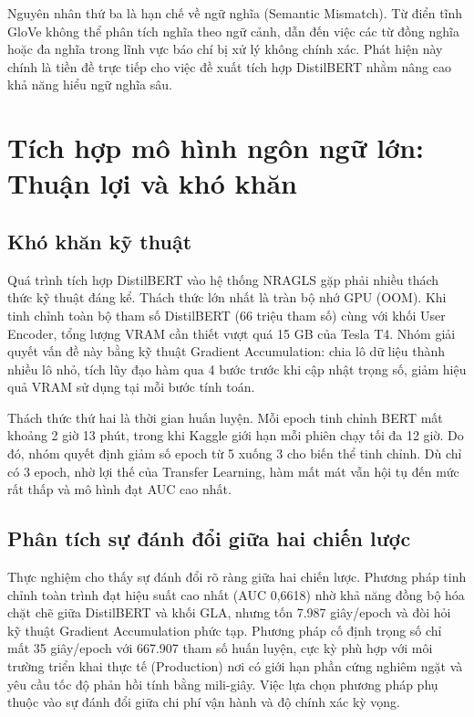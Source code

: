 \documentclass[../BTL.tex]{subfiles}
\begin{document}
Nguyên nhân thứ ba là hạn chế về ngữ nghĩa (Semantic Mismatch). Từ điển tĩnh GloVe không thể phân tích nghĩa theo ngữ cảnh, dẫn đến việc các từ đồng nghĩa hoặc đa nghĩa trong lĩnh vực báo chí bị xử lý không chính xác. Phát hiện này chính là tiền đề trực tiếp cho việc đề xuất tích hợp DistilBERT nhằm nâng cao khả năng hiểu ngữ nghĩa sâu.

\section{Tích hợp mô hình ngôn ngữ lớn: Thuận lợi và khó khăn}

\subsection{Khó khăn kỹ thuật}

Quá trình tích hợp DistilBERT vào hệ thống NRAGLS gặp phải nhiều thách thức kỹ thuật đáng kể. Thách thức lớn nhất là tràn bộ nhớ GPU (OOM). Khi tinh chỉnh toàn bộ tham số DistilBERT (66 triệu tham số) cùng với khối User Encoder, tổng lượng VRAM cần thiết vượt quá 15 GB của Tesla T4. Nhóm giải quyết vấn đề này bằng kỹ thuật Gradient Accumulation: chia lô dữ liệu thành nhiều lô nhỏ, tích lũy đạo hàm qua 4 bước trước khi cập nhật trọng số, giảm hiệu quả VRAM sử dụng tại mỗi bước tính toán.

Thách thức thứ hai là thời gian huấn luyện. Mỗi epoch tinh chỉnh BERT mất khoảng 2 giờ 13 phút, trong khi Kaggle giới hạn mỗi phiên chạy tối đa 12 giờ. Do đó, nhóm quyết định giảm số epoch từ 5 xuống 3 cho biến thể tinh chỉnh. Dù chỉ có 3 epoch, nhờ lợi thế của Transfer Learning, hàm mất mát vẫn hội tụ đến mức rất thấp và mô hình đạt AUC cao nhất.

\subsection{Phân tích sự đánh đổi giữa hai chiến lược}

Thực nghiệm cho thấy sự đánh đổi rõ ràng giữa hai chiến lược. Phương pháp tinh chỉnh toàn trình đạt hiệu suất cao nhất (AUC 0,6618) nhờ khả năng đồng bộ hóa chặt chẽ giữa DistilBERT và khối GLA, nhưng tốn 7.987 giây/epoch và đòi hỏi kỹ thuật Gradient Accumulation phức tạp. Phương pháp cố định trọng số chỉ mất 35 giây/epoch với 667.907 tham số huấn luyện, cực kỳ phù hợp với môi trường triển khai thực tế (Production) nơi có giới hạn phần cứng nghiêm ngặt và yêu cầu tốc độ phản hồi tính bằng mili-giây. Việc lựa chọn phương pháp phụ thuộc vào sự đánh đổi giữa chi phí vận hành và độ chính xác kỳ vọng.
\end{document}
